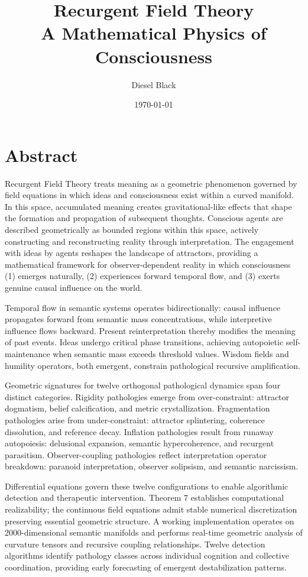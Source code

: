 \documentclass[11pt, a4paper]{report}
\title{Recurgent Field Theory \\ A Mathematical Physics of Consciousness}
\author{Diesel Black}
\date{\today}
\begin{document}
\maketitle

\section*{Abstract}
Recurgent Field Theory treats meaning as a geometric phenomenon governed by field equations in which ideas and consciousness exist within a curved manifold. In this space, accumulated meaning creates gravitational-like effects that shape the formation and propagation of subsequent thoughts. Conscious agents are described geometrically as bounded regions within this space, actively constructing and reconstructing reality through interpretation. The engagement with ideas by agents reshapes the landscape of attractors, providing a mathematical framework for observer-dependent reality in which consciousness (1) emerges naturally, (2) experiences forward temporal flow, and (3) exerts genuine causal influence on the world.

Temporal flow in semantic systems operates bidirectionally: causal influence propagates forward from semantic mass concentrations, while interpretive influence flows backward. Present reinterpretation thereby modifies the meaning of past events. Ideas undergo critical phase transitions, achieving autopoietic self-maintenance when semantic mass exceeds threshold values. Wisdom fields and humility operators, both emergent, constrain pathological recursive amplification.

Geometric signatures for twelve orthogonal pathological dynamics span four distinct categories. Rigidity pathologies emerge from over-constraint: attractor dogmatism, belief calcification, and metric crystallization. Fragmentation pathologies arise from under-constraint: attractor splintering, coherence dissolution, and reference decay. Inflation pathologies result from runaway autopoiesis: delusional expansion, semantic hypercoherence, and recurgent parasitism. Observer-coupling pathologies reflect interpretation operator breakdown: paranoid interpretation, observer solipsism, and semantic narcissism.

Differential equations govern these twelve configurations to enable algorithmic detection and therapeutic intervention. Theorem 7 establishes computational realizability; the continuous field equations admit stable numerical discretization preserving essential geometric structure. A working implementation operates on 2000-dimensional semantic manifolds and performs real-time geometric analysis of curvature tensors and recursive coupling relationships. Twelve detection algorithms identify pathology classes across individual cognition and collective coordination, providing early forecasting of emergent destabilization patterns.
\end{document}
